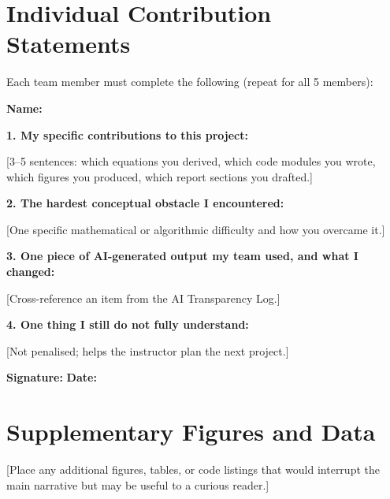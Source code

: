 \documentclass[11pt,a4paper]{article}
\theoremstyle{definition}
\theoremstyle{remark}
\begin{document}
\section{Individual Contribution Statements}

Each team member must complete the following (repeat for all 5 members):

\begin{formbox}
\textbf{Name:} \underline{\hspace{5cm}}

\vspace{0.5em}
\textbf{1. My specific contributions to this project:}

[3--5 sentences: which equations you derived, which code modules you wrote,
which figures you produced, which report sections you drafted.]

\vspace{0.5em}
\textbf{2. The hardest conceptual obstacle I encountered:}

[One specific mathematical or algorithmic difficulty and how you overcame it.]

\vspace{0.5em}
\textbf{3. One piece of AI-generated output my team used, and what I changed:}

[Cross-reference an item from the AI Transparency Log.]

\vspace{0.5em}
\textbf{4. One thing I still do not fully understand:}

[Not penalised; helps the instructor plan the next project.]

\vspace{0.5em}
\textbf{Signature:} \underline{\hspace{4cm}} \quad \textbf{Date:} \underline{\hspace{2cm}}
\end{formbox}

\section{Supplementary Figures and Data}

[Place any additional figures, tables, or code listings that would interrupt the
main narrative but may be useful to a curious reader.]
\end{document}
